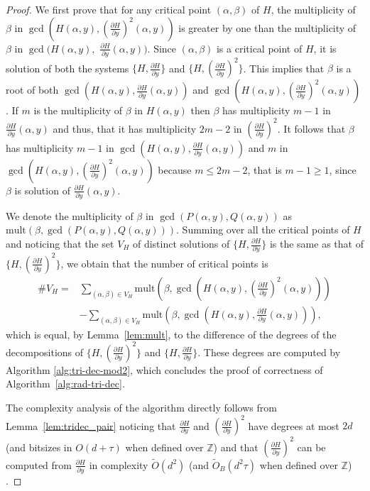 \documentclass{sig-alternate}
\newcommand {\Z}   {\mathbb Z}
\newcommand{\OO}{\ensuremath{{{O}}}}
\newcommand{\sO}{\ensuremath{\widetilde{{O}}}}
\newcommand{\sOB}{\ensuremath{\widetilde{{O}}_B}}
\renewcommand{\leq}{\leqslant}  \renewcommand{\geq}{\geqslant}
\begin{document}
\begin{proof}
We first prove that for any critical point $(\alpha,\beta)$ of $H$, the multiplicity of $\beta$ in
$\gcd(H(\alpha,y),(\frac{\partial H}{\partial y})^2(\alpha,y))$ is greater by one than the
multiplicity of $\beta$ in  $\gcd(H(\alpha,y),$ $\frac{\partial H}{\partial y}(\alpha,y))$. 
Since $(\alpha,\beta)$ is a critical point of $H$, it is  solution of both the systems $\{H,\frac{\partial H}{\partial y}\}$ and $\{H,(\frac{\partial H}{\partial y})^2\}$. This implies that $\beta$ is a root of both $\gcd(H(\alpha,y),\frac{\partial H}{\partial y}(\alpha,y))$ and $\gcd(H(\alpha,y),(\frac{\partial H}{\partial y})^2(\alpha,y))$. If $m$  is the multiplicity of $\beta$ in $H(\alpha,y)$ then $\beta$ has multiplicity $m-1$ in $\frac{\partial H}{\partial y}(\alpha,y)$ and thus, that it has multiplicity $2m-2$ in $(\frac{\partial H}{\partial y})^2$. It follows that
$\beta$ has multiplicity $m-1$ in $\gcd(H(\alpha,y),\frac{\partial H}{\partial y}(\alpha,y))$ and
$m$ in $\gcd(H(\alpha,y),(\frac{\partial H}{\partial y})^2(\alpha,y))$ because $m\leq 2m-2$, that is
$m-1\geq 1$, since
$\beta$ is solution of $\frac{\partial H}{\partial y}(\alpha,y)$.

We denote  the multiplicity of $\beta$ in $\gcd(P(\alpha,y),Q(\alpha,y))$  as $\text{mult}(\beta,\gcd(P(\alpha,y),Q(\alpha,y)))$.
Summing 
over all the critical points of $H$ and noticing that the set  $V_H$ of distinct solutions of $\{
H,\frac{\partial H}{\partial y}\}$ is the same as that of $\{ H,(\frac{\partial H}{\partial
y})^2\}$, we obtain that the number of critical points is
\[\begin{split}
\#V_H= &
 \sum_{(\alpha,\beta) \in V_H}{\text{mult}(\beta,\gcd(H(\alpha,y),(\frac{\partial H}{\partial y})^2(\alpha,y)))}\\
&-\sum_{(\alpha,\beta) \in V_H}{\text{mult}(\beta,\gcd(H(\alpha,y),\frac{\partial H}{\partial
y}(\alpha,y)))},
\end{split}\]
which is equal, by Lemma~\ref{lem:mult},  to the difference of the degrees of the decompositions of $\{ H,(\frac{\partial H}{\partial y})^2\}$ and $\{ H,\frac{\partial
  H}{\partial y}\}$. These degrees are  computed by Algorithm \ref{alg:tri-dec-mod2}, which
  concludes the proof of correctness of Algorithm~\ref{alg:rad-tri-dec}.




The complexity analysis of the algorithm directly follows from Lemma~\ref{lem:tridec_pair} noticing that
$\frac{\partial H}{\partial y}$ and $(\frac{\partial H}{\partial y})^2$ have degrees at most $2d$
(and bitsizes in $\OO(d+\tau)$ when defined over $\Z$) and that $(\frac{\partial H}{\partial y})^2$ can be computed from
$\frac{\partial H}{\partial y}$ in 
complexity $\sO(d^2)$ (and $\sOB(d^2\tau)$ when defined over $\Z$) \cite[Cor. 8.28]{vzGGer2}.
\end{proof}
\end{document}
